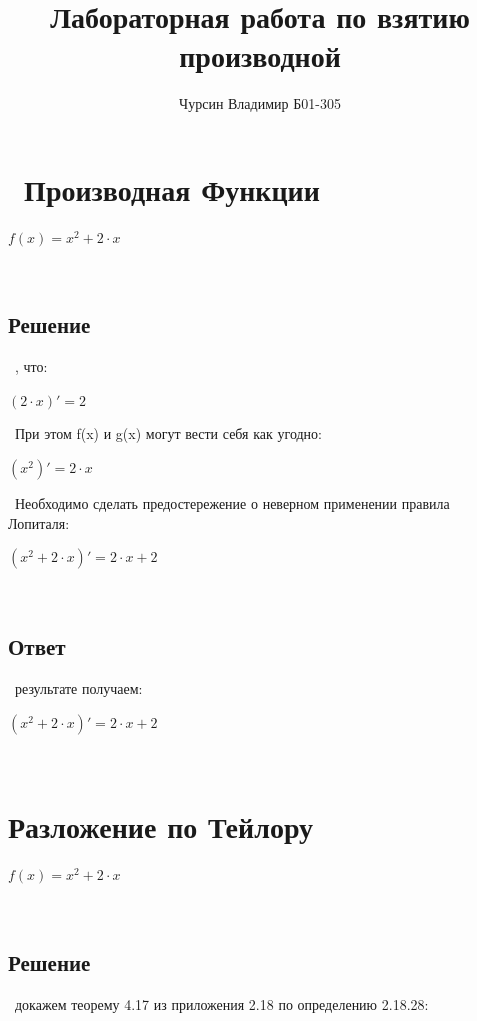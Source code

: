 \documentclass[a4paper,14pt]{extarticle}
\title{\textbf{Лабораторная работа по взятию производной }}\author{Чурсин Владимир Б01-305}
\begin{document}
\maketitle
\section{\ Производная Функции \\}\begin{center}$f\left(x\right) = x^2+2 \cdot x$ \end{center}\  
\subsection{Решение}\ , что: \\ 

\begin{center}$\left(2 \cdot x \right)' = 2$\end{center}\ 
При этом f(x) и g(x) могут вести себя как угодно: \\ 

\begin{center}$\left(x^2 \right)' = 2 \cdot x$\end{center}\ 
Необходимо сделать предостережение о неверном применении правила Лопиталя: \\ 

\begin{center}$\left(x^2+2 \cdot x \right)' = 2 \cdot x+2$\end{center}\ 
\subsection{Ответ}\  результате получаем: \\
\begin{center}$\left(x^2+2 \cdot x \right)' = 2 \cdot x+2$\end{center}\ 
\section{Разложение по Тейлору}\begin{center}$f\left(x\right) = x^2+2 \cdot x$ \end{center}\ 
\subsection{Решение}\  докажем теорему 4.17 из приложения 2.18 по определению 2.18.28: \\ 
\end{document}
